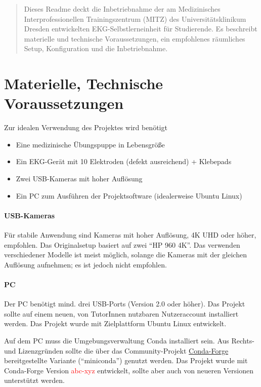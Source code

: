 \documentclass[a4paper]{article}
\newcommand{\warn}[1]{\textcolor{red}{#1}}
\begin{document}
\begin{abstract}
    Dieses Readme deckt die Inbetriebnahme der am Medizinisches Interprofessionellen Trainingszentrum (MITZ) des Universitätsklinikum Dresden entwickelten EKG-Selbstlerneinheit für Studierende. Es beschreibt materielle und technische Voraussetzungen, ein empfohlenes räumliches Setup, Konfiguration und die Inbetriebnahme.
\end{abstract}

\section{Materielle, Technische Voraussetzungen}
\label{sec:prerequisites}
Zur idealen Verwendung des Projektes wird benötigt
\begin{itemize}
    \item Eine medizinische Übungspuppe in Lebensgröße
    \item Ein EKG-Gerät mit 10 Elektroden (defekt ausreichend) + Klebepads
    \item Zwei USB-Kameras mit hoher Auflösung
    \item Ein PC zum Ausführen der Projektsoftware (idealerweise Ubuntu Linux)
\end{itemize}

\paragraph{USB-Kameras}
Für stabile Anwendung sind Kameras mit hoher Auflösung, 4K UHD oder höher, empfohlen. Das Originalsetup basiert auf zwei \enquote{HP 960 4K}. Das verwenden verschiedener Modelle ist meist möglich, solange die Kameras mit der gleichen Auflösung aufnehmen; es ist jedoch nicht empfohlen.

\paragraph{PC}
Der PC benötigt mind. drei USB-Ports (Version 2.0 oder höher). Das Projekt sollte auf einem neuen, von TutorInnen nutzbaren Nutzeraccount installiert werden. Das Projekt wurde mit Zielplattform Ubuntu Linux entwickelt.

Auf dem PC muss die Umgebungsverwaltung Conda installiert sein. Aus Rechts- und Lizenzgründen sollte die über das Community-Projekt \href{https://conda-forge.org/}{Conda-Forge} bereitgestellte Variante (\enquote{miniconda}) genutzt werden. Das Projekt wurde mit Conda-Forge Version \warn{abc-xyz} entwickelt, sollte aber auch von neueren Versionen unterstützt werden.
\end{document}
